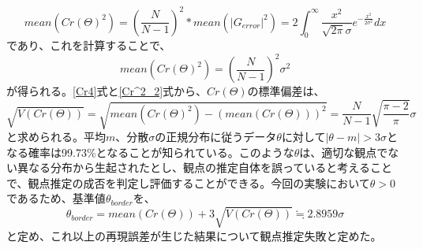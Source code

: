 	\begin{equation}
		\label{Cr^2_1}
		mean(Cr(Θ)^2) = \left(\frac{N}{N-1}\right)^2 * mean(|G_{error}|^2) 
		= 2\int_{0}^{\infty}\frac{x^2}{\sqrt{2\pi}σ}e^{-\frac{x^2}{2σ^2}}dx
	\end{equation}
であり、これを計算することで、
	\begin{equation}
		\label{Cr^2_2}
		mean(Cr(Θ)^2) = \left(\frac{N}{N-1}\right)^2 σ^2
	\end{equation}
が得られる。\ref{Cr4}式と\ref{Cr^2_2}式から、$Cr(Θ)$の標準偏差は、
	\begin{equation}
		\sqrt{V(Cr(Θ))} = \sqrt{mean(Cr(Θ)^2) - \left(mean(Cr(Θ))\right)^2} = \frac{N}{N-1}\sqrt{\frac{\pi-2}{\pi}}σ
	\end{equation}
と求められる。平均$m$、分散$σ$の正規分布に従うデータ$θ$に対して$|θ-m|>3σ$となる確率は99.73\%となることが知られている。このような$θ$は、適切な観点でない異なる分布から生起されたとし、観点の推定自体を誤っていると考えることで、観点推定の成否を判定し評価することができる。今回の実験において$θ>0$であるため、基準値$θ_{border}$を、
	\begin{equation}
		θ_{border} = mean(Cr(Θ))+3\sqrt{V(Cr(Θ))}≒2.8959σ
	\end{equation}
と定め、これ以上の再現誤差が生じた結果について観点推定失敗と定めた。



